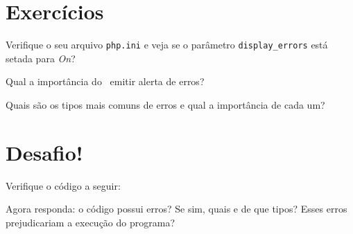 


\section{Exercícios}
\label{cap11-exercicios}

\begin{description}[labelindent=30pt]
  \item [Q. 01] Verifique o seu arquivo \texttt{php.ini} e veja se o parâmetro \texttt{display\_errors} está 
  setada para \textit{On}?  
  \item [Q. 02] Qual a importância do \php~emitir alerta de erros? 
  \item [Q. 03] Quais são os tipos mais comuns de erros e qual a importância de cada um?
  
\end{description}

\section{Desafio!}
\label{cap11-desafio}

Verifique o código a seguir:



Agora responda: o código possui erros? Se sim, quais e de que tipos? Esses erros prejudicariam a execução do programa? 